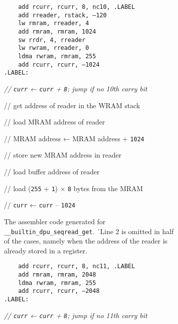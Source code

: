 \begin{figure}[t]
	\begin{subfigure}{\textwidth}
		\begin{minipage}{ \widthof{\lstinline|	add rcurr, rcurr, 8, nc10, .LABEL|} }
			\begin{lstlisting}
	add rcurr, rcurr, 8, nc10, .LABEL
	add rreader, rstack, –120
	lw rmram, rreader, 4
	add rmram, rmram, 1024
	sw rrdr, 4, rreader
	lw rwram, rreader, 0
	ldma rwram, rmram, 255
	add rcurr, rcurr, –1024
.LABEL:\end{lstlisting}
		\end{minipage}
		\hfill
		\begin{minipage}{ \widthof{// \lstinline|curr| ← \lstinline|curr| + \lstinline|8|; jump if no 10th carry bit} }
			\itshape
			// \lstinline|curr| ← \lstinline|curr| + \lstinline|8|; jump if no 10th carry bit

			// get address of reader in the \ac{WRAM} stack

			// load \ac{MRAM} address of reader

			// \ac{MRAM} address ← \ac{MRAM} address + \lstinline|1024|

			// store new \ac{MRAM} address in reader

			// load buffer address of reader

			// load (\lstinline|255| + \lstinline|1|) × \lstinline|8| bytes from the \ac{MRAM}

			// \lstinline|curr| ← \lstinline|curr| – \lstinline|1024|

			\phantom{lg}
		\end{minipage}

		\caption{
			The assembler code generated for \lstinline|__builtin_dpu_seqread_get|.
			´Line 2 is omitted in half of the cases, namely when the address of the reader is already stored in a register.
		}
		\label{fig:mram:assembler:auto}
	\end{subfigure}

	\smallskip

	\begin{subfigure}{\textwidth}
		\begin{minipage}{ \widthof{\lstinline|	add rcurr, rcurr, 8, nc10, .LABEL|} }
			\begin{lstlisting}
	add rcurr, rcurr, 8, nc11, .LABEL
	add rmram, rmram, 2048
	ldma rwram, rmram, 255
	add rcurr, rcurr, –2048
.LABEL:\end{lstlisting}
		\end{minipage}
		\hfill
		\begin{minipage}{ \widthof{// \lstinline|curr| ← \lstinline|curr| + \lstinline|8|; jump if no 10th carry bit} }
			\itshape
			// \lstinline|curr| ← \lstinline|curr| + \lstinline|8|; jump if no 11th carry bit


\end{minipage}
\end{subfigure}
\end{figure}
